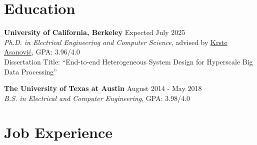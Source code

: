 \documentclass[line]{res}
\begin{document}
\address{\href{https://abejgonzalez.github.io}{https://abejgonzalez.github.io} $|$ \href{mailto:abe.gonzalez@berkeley.edu}{abe.gonzalez@berkeley.edu}}

\begin{resume}

\vspace{-8mm}

\section{\Large{Education}}
\label{sec:education}
\vspace{1mm}

\textbf{University of California, Berkeley} \hfill Expected July 2025
\\
\textit{Ph.D. in Electrical Engineering and Computer Science}, advised by \href{https://people.eecs.berkeley.edu/~krste/}{Krste Asanovi\'c}, GPA: 3.96/4.0
\\
Dissertation Title: ``End-to-end Heterogeneous System Design for Hyperscale Big Data Processing''

\vspace{-3mm}

\textbf{The University of Texas at Austin} \hfill August 2014 - May 2018
\\
\textit{B.S. in Electrical and Computer Engineering}, GPA: 3.98/4.0

\vspace{-3mm}

\section{\Large{Job Experience}}
\label{sec:jobs}
\vspace{1mm}


\end{resume}
\end{document}
